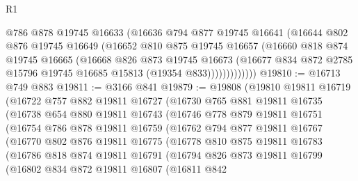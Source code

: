 \begin{lexlean}{R1}
\begin{coremodule}
                @786
                @878
                @19745
                @16633
                (@16636
                  @794
                  @877
                  @19745
                  @16641
                  (@16644
                    @802
                    @876
                    @19745
                    @16649
                    (@16652
                      @810
                      @875
                      @19745
                      @16657
                      (@16660
                        @818
                        @874
                        @19745
                        @16665
                        (@16668
                          @826
                          @873
                          @19745
                          @16673
                          (@16677
                            @834
                            @872
                            @2785
                            @15796
                            @19745
                            @16685
                            @15813
                            (@19354 @833)))))))))))))
@19810 := @16713 @749 @883
@19811 := @3166 @841
@19879 := @19808
    (@19810
      @19811
      @16719
      (@16722
        @757
        @882
        @19811
        @16727
        (@16730
          @765
          @881
          @19811
          @16735
          (@16738
            @654
            @880
            @19811
            @16743
            (@16746
              @778
              @879
              @19811
              @16751
              (@16754
                @786
                @878
                @19811
                @16759
                (@16762
                  @794
                  @877
                  @19811
                  @16767
                  (@16770
                    @802
                    @876
                    @19811
                    @16775
                    (@16778
                      @810
                      @875
                      @19811
                      @16783
                      (@16786
                        @818
                        @874
                        @19811
                        @16791
                        (@16794
                          @826
                          @873
                          @19811
                          @16799
                          (@16802
                            @834
                            @872
                            @19811
                            @16807
                            (@16811
                              @842

\end{coremodule}
\end{lexlean}
